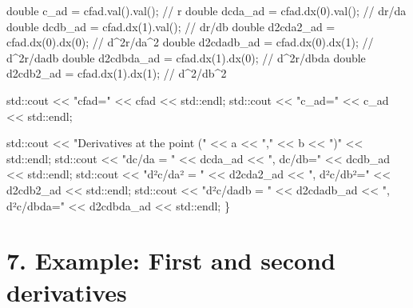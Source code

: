 \begin{DoxyCode}
    \textcolor{keywordtype}{double} c\_ad = cfad.val().val();       \textcolor{comment}{// r}
    \textcolor{keywordtype}{double} dcda\_ad = cfad.dx(0).val();    \textcolor{comment}{// dr/da}
    \textcolor{keywordtype}{double} dcdb\_ad = cfad.dx(1).val();    \textcolor{comment}{// dr/db}
    \textcolor{keywordtype}{double} d2cda2\_ad = cfad.dx(0).dx(0);  \textcolor{comment}{// d^2r/da^2}
    \textcolor{keywordtype}{double} d2cdadb\_ad = cfad.dx(0).dx(1); \textcolor{comment}{// d^2r/dadb}
    \textcolor{keywordtype}{double} d2cdbda\_ad = cfad.dx(1).dx(0); \textcolor{comment}{// d^2r/dbda}
    \textcolor{keywordtype}{double} d2cdb2\_ad = cfad.dx(1).dx(1);  \textcolor{comment}{// d^2/db^2}
 
 
    std::cout << \textcolor{stringliteral}{"cfad="} << cfad << std::endl;
    std::cout << \textcolor{stringliteral}{"c\_ad="} << c\_ad << std::endl;
 
    std::cout << \textcolor{stringliteral}{"Derivatives at the point ("} << a << \textcolor{stringliteral}{","} << b << \textcolor{stringliteral}{")"} << std::endl;
    std::cout << \textcolor{stringliteral}{"dc/da = "} << dcda\_ad << \textcolor{stringliteral}{", dc/db="} << dcdb\_ad << std::endl;
    std::cout << \textcolor{stringliteral}{"d²c/da² = "} << d2cda2\_ad << \textcolor{stringliteral}{", d²c/db²="} << d2cdb2\_ad << std::endl;
    std::cout << \textcolor{stringliteral}{"d²c/dadb = "} << d2cdadb\_ad << \textcolor{stringliteral}{", d²c/dbda="} << d2cdbda\_ad << std::endl;
\}
\end{DoxyCode}
 \hypertarget{index_Ex7}{}\section{7. Example\+: First and second derivatives}\label{index_Ex7}

